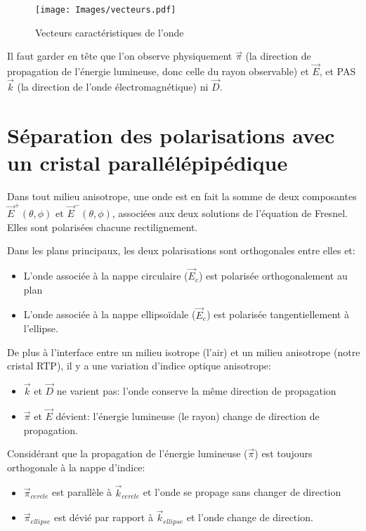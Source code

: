 \documentclass[a4paper,11pt]{report}
\begin{document}
\begin{figure}[h]
    \begin{center}
        \texttt{[image: Images/vecteurs.pdf]}
        \caption{Vecteurs caractéristiques de l'onde}
        \label{vecteurs}
    \end{center}
\end{figure}


Il faut garder en tête que l'on observe physiquement $\vec{\pi}$ (la direction de propagation de l'énergie lumineuse, donc celle du rayon observable) et $\vec{E}$, et PAS $\vec{k}$ (la direction de l'onde électromagnétique) ni $\vec{D}$.

\section{Séparation des polarisations avec un cristal parallélépipédique}
Dans tout milieu anisotrope, une onde est en fait la somme de deux composantes $\vec{E}^+(\theta,\phi)$ et $\vec{E}^-(\theta,\phi)$, associées aux deux solutions de l'équation de Fresnel. Elles sont polarisées chacune rectilignement.

Dans les plans principaux, les deux polarisations sont orthogonales entre elles et:
\begin{itemize}
    \item L'onde associée à la nappe circulaire ($\vec{E}_{c}$) est polarisée orthogonalement au plan
    \item L'onde associée à la nappe ellipsoïdale ($\vec{E}_{e}$) est polarisée tangentiellement à l'ellipse.
\end{itemize}

\newpage
De plus à l'interface entre un milieu isotrope (l'air) et un milieu anisotrope (notre cristal RTP), il y a une variation d'indice optique anisotrope:
\begin{itemize}
    \item $\vec{k}$ et $\vec{D}$ ne varient pas: l'onde conserve la même direction de propagation
    \item $\vec{\pi}$ et $\vec{E}$ dévient: l'énergie lumineuse (le rayon) change de direction de propagation.\newline
\end{itemize}

Considérant que la propagation de l'énergie lumineuse ($\vec{\pi}$) est toujours orthogonale à la nappe d'indice:
\begin{itemize}
    \item $\vec{\pi}_{cercle}$ est parallèle à $\vec{k}_{cercle}$ et l'onde se propage sans changer de direction
    \item $\vec{\pi}_{ellipse}$ est dévié par rapport à $\vec{k}_{ellipse}$ et l'onde change de direction.
\end{itemize}
\end{document}
